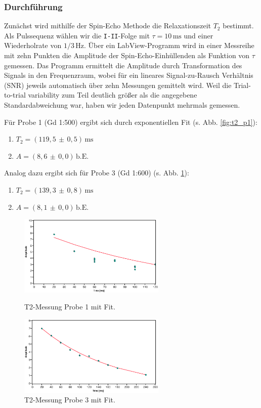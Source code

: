 \documentclass[a4paper]{scrartcl} %
\newcommand{\err}[2]{( #1 \, \pm \, #2 )} %
\newcommand{\ms}{\, \mathrm{ms}}
\newcommand{\be}{\, \mathrm{b.E.}}
\newcommand{\hz}{\, \mathrm{Hz}}
\begin{document}
\subsubsection{Durchführung}

Zunächst wird mithilfe der Spin-Echo Methode die Relaxationszeit $T_2$ bestimmt. Als Pulssequenz wählen wir die \texttt{I-II}-Folge mit $\tau = 10\ms$ und einer Wiederholrate von $1/3\hz$. Über ein LabView-Programm wird in einer Messreihe mit zehn Punkten die Amplitude der Spin-Echo-Einhüllenden als Funktion von $\tau$ gemessen. Das Programm ermittelt die Amplitude durch Transformation des Signals in den Frequenzraum, wobei für ein lineares Signal-zu-Rausch Verhältnis (SNR) jeweils automatisch über zehn Messungen gemittelt wird. Weil die Trial-to-trial variability zum Teil deutlich größer als die angegebene Standardabweichung war, haben wir jeden Datenpunkt mehrmals gemessen.

Für Probe 1 (Gd 1:500) ergibt sich durch exponentiellen Fit (s. Abb. \ref{fig:t2_p1}):
\begin{enumerate}
	\item[] $T_2 = \err{119,5}{0,5} \ms$
	\item[] $A = \err{8,6}{0,0} \be$
\end{enumerate}
Analog dazu ergibt sich für Probe 3 (Gd 1:600) (s. Abb. \ref{fig:t2_p3}):
\begin{enumerate}
	\item[] $T_2 = \err{139,3}{0,8} \ms$
	\item[] $A = \err{8,1}{0,0} \be$
\end{enumerate}
\begin{figure}[H]
	\centering
	\parbox{70mm}{
		\centering
		\includegraphics[width=70mm]{./Resources/t2_meas_p1.eps}
		\caption{T2-Messung Probe 1 mit Fit.}
		\label{fig:t2_p1}
	}
	\hspace*{\fill}
	\parbox{70mm}{
		\centering
		\includegraphics[width=70mm]{./Resources/t2_meas_p3.eps}
		\caption{T2-Messung Probe 3 mit Fit.}
		\label{fig:t2_p3}
	}
\end{figure}
\end{document}
